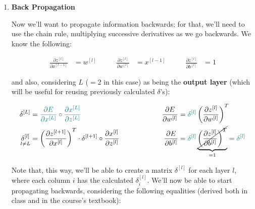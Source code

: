 \documentclass[12pt]{article}
\begin{document}
\begin{enumerate}[leftmargin=\labelsep]
\begin{enumerate}
                \pagebreak

          \item \textbf{Back Propagation}

                Now we'll want to propagate information backwards; for that, we'll need to use
                the chain rule, multiplying successive derivatives as we go backwards.
                We know the following:

                \begin{equation*}
                  \begin{aligned}
                    \frac{\partial z^{[l]}}{\partial x^{[l - 1]}} & = w^{[l]}     & \qquad
                    \frac{\partial z^{[l]}}{\partial w^{[l]}}     & = x^{[l - 1]} & \qquad
                    \frac{\partial z^{[l]}}{\partial b^{[l]}}     & = 1
                  \end{aligned}
                \end{equation*}

                \vskip 0.5cm

                and also, considering $L$ ($=2$ in this case) as being the \textbf{output layer} (which will be useful for reusing previously calculated $\delta$'s):

                \begin{equation*}
                  \begin{aligned}
                    \delta^{[L]}                        & = \textcolor{teal}{\frac{\partial E}{\partial x^{[L]}} \circ \frac{\partial x^{[L]}}{\partial z^{[L]}}}                                                & \qquad & \qquad &
                    \frac{\partial E}{\partial w^{[l]}} & = \textcolor{teal}{\delta^{[l]}} \left(\frac{\partial z^{[l]}}{\partial w^{[l]}}\right)^T                                                                                  \\
                    \underset{l \neq L}{\delta^{[l]}}   & = \left(\frac{\partial z^{[l + 1]}}{\partial x^{[l]}}\right)^T \cdot \delta^{[l + 1]} \circ \frac{\partial x^{[l]}}{\partial z^{[l]}}                  & \qquad & \qquad &
                    \frac{\partial E}{\partial b^{[l]}} & = \textcolor{teal}{\delta^{[l]}} \underbrace{\cancel{\left(\frac{\partial z^{[l]}}{\partial b^{[l]}}\right)^T}}_{= 1} = \textcolor{teal}{\delta^{[l]}}
                  \end{aligned}
                \end{equation*}

                Note that, this way, we'll be able to create a matrix $\delta^{[l]}$ for each
                layer $l$, where each column $i$ has the calculated $\delta_i^{[l]}$.
                We'll now be able to start propagating backwards, considering the following equalities
                (derived both in class and in the course's textbook):


\end{enumerate}
\end{enumerate}
\end{document}
